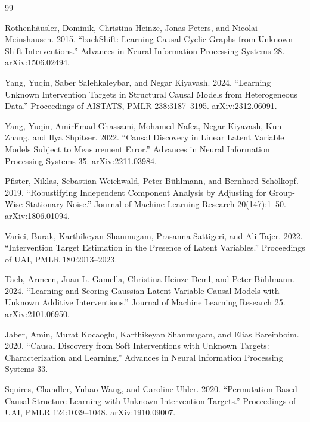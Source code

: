 \documentclass{article}
\begin{document}
\begin{thebibliography}{99}

   Rothenhäusler, Dominik, Christina Heinze, Jonas Peters, and Nicolai Meinshausen. 2015. ``backShift: Learning Causal Cyclic Graphs from Unknown Shift Interventions.'' Advances in Neural Information Processing Systems 28. arXiv:1506.02494.

   Yang, Yuqin, Saber Salehkaleybar, and Negar Kiyavash. 2024. ``Learning Unknown Intervention Targets in Structural Causal Models from Heterogeneous Data.'' Proceedings of AISTATS, PMLR 238:3187--3195. arXiv:2312.06091.

   Yang, Yuqin, AmirEmad Ghassami, Mohamed Nafea, Negar Kiyavash, Kun Zhang, and Ilya Shpitser. 2022. ``Causal Discovery in Linear Latent Variable Models Subject to Measurement Error.'' Advances in Neural Information Processing Systems 35. arXiv:2211.03984.

   Pfister, Niklas, Sebastian Weichwald, Peter Bühlmann, and Bernhard Schölkopf. 2019. ``Robustifying Independent Component Analysis by Adjusting for Group-Wise Stationary Noise.'' Journal of Machine Learning Research 20(147):1--50. arXiv:1806.01094.

   Varici, Burak, Karthikeyan Shanmugam, Prasanna Sattigeri, and Ali Tajer. 2022. ``Intervention Target Estimation in the Presence of Latent Variables.'' Proceedings of UAI, PMLR 180:2013--2023.

   Taeb, Armeen, Juan L. Gamella, Christina Heinze-Deml, and Peter Bühlmann. 2024. ``Learning and Scoring Gaussian Latent Variable Causal Models with Unknown Additive Interventions.'' Journal of Machine Learning Research 25. arXiv:2101.06950.

   Jaber, Amin, Murat Kocaoglu, Karthikeyan Shanmugam, and Elias Bareinboim. 2020. ``Causal Discovery from Soft Interventions with Unknown Targets: Characterization and Learning.'' Advances in Neural Information Processing Systems 33.

   Squires, Chandler, Yuhao Wang, and Caroline Uhler. 2020. ``Permutation-Based Causal Structure Learning with Unknown Intervention Targets.'' Proceedings of UAI, PMLR 124:1039--1048. arXiv:1910.09007.


\end{thebibliography}
\end{document}
